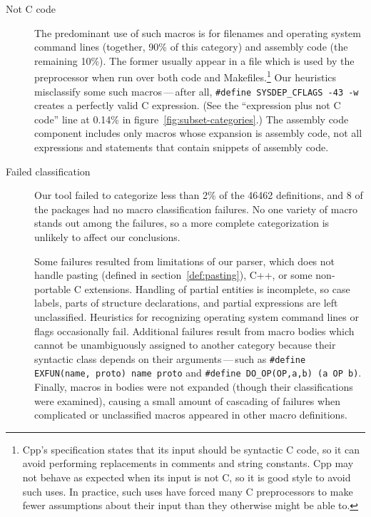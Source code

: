 \begin{description}
\item[Not C code]\label{page:not-c-code}
  The predominant use of such macros is for filenames and operating system
  command lines (together, 90\% of this category) and assembly code (the
  remaining 10\%).  The former usually appear in a file which is used by
  the preprocessor when run over both code and Makefiles.\footnote{Cpp's
    specification states that its input should be syntactic C code, so it
    can avoid performing replacements in comments and string constants.
    Cpp may not behave as expected when its input is not C, so it is good
    style to avoid such uses.  In practice, such uses have forced many C
    preprocessors to make fewer assumptions about their input than they
    otherwise might be able to.}  Our heuristics misclassify some such
  macros\,---\,after all, {\tt \#define \verb|SYSDEP_CFLAGS| -43 -w}
  creates a perfectly valid C expression.  (See the ``expression plus not C
  code'' line at 0.14\% in figure~\ref{fig:subset-categories}.)  The
  assembly code component includes only macros whose expansion is assembly
  code, not all expressions and statements that contain snippets of
  assembly code.

\item[Failed classification]
  Our tool failed to categorize less than 2\% of the 46462 definitions, and
  8 of the {\numpackages} packages had no macro classification failures.
  No one variety of macro stands out among the failures, so a more complete
  categorization is unlikely to affect our conclusions.
  
  Some failures resulted from limitations of our parser, which does not
  handle pasting (defined in section~\ref{def:pasting}), C++, or some
  non-portable C extensions.  Handling of partial entities is incomplete,
  so case labels, parts of structure declarations, and partial expressions
  are left unclassified.  Heuristics for recognizing operating system
  command lines or flags occasionally fail.  Additional failures result
  from macro bodies which cannot be unambiguously assigned to another
  category because their syntactic class depends on their
  arguments\,---\,such as {\tt \#define EXFUN(name, proto) name proto} and
  {\tt \#define
\verb|DO_OP|(OP,a,b) (a OP b)}.  Finally, macros in bodies were not
expanded (though their classifications were examined), causing a small
amount of cascading of failures when complicated or unclassified macros
appeared in other macro definitions.

\end{description}

